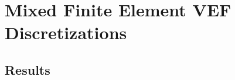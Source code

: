 \documentclass[../doc.tex]{subfiles}
\begin{document}
\chapter{Mixed Finite Element VEF Discretizations}

\section{Results}
\begin{table}
\centering
\caption{}
\label{}

\end{table}
\end{document}
